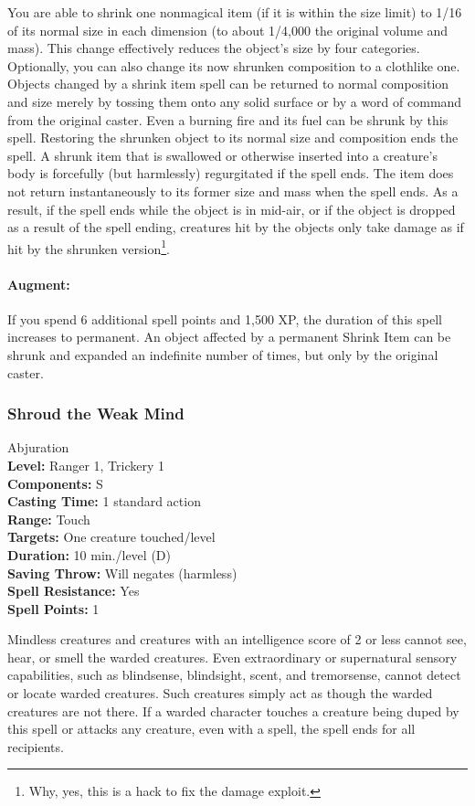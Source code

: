 You are able to shrink one nonmagical item (if it is within the size limit) to 1/16 of its normal size in each dimension (to about 1/4,000 the original volume and mass). This change effectively reduces the object's size by four categories. 
Optionally, you can also change its now shrunken composition to a clothlike one. 
Objects changed by a shrink item spell can be returned to normal composition and size merely by tossing them onto any solid surface or by a word of command from the original caster.
Even a burning fire and its fuel can be shrunk by this spell. 
Restoring the shrunken object to its normal size and composition ends the spell.
A shrunk item that is swallowed or otherwise inserted into a creature's body is forcefully (but harmlessly) regurgitated if the spell ends.
The item does not return instantaneously to its former size and mass when the spell ends. As a result, if the spell ends while the object is in mid-air, or if the object is dropped as a result of the spell ending, creatures hit by the objects only take damage as if hit by the shrunken version\footnote{Why, yes, this is a hack to fix the damage exploit.}.

\paragraph{Augment:} If you spend 6 additional spell points and 1,500 XP, the duration of this spell increases to permanent. An object affected by a permanent Shrink Item can be shrunk and expanded an indefinite number of times, but only by the original caster.
\subsubsection{Shroud the Weak Mind}
\label{Spell:ShroudTheWeakMind}
Abjuration
\\ \textbf{Level:} Ranger 1, Trickery 1
\\ \textbf{Components:} S
\\ \textbf{Casting Time:} 1 standard action
\\ \textbf{Range:} Touch
\\ \textbf{Targets:} One creature touched/level
\\ \textbf{Duration:} 10 min./level (D)
\\ \textbf{Saving Throw:} Will negates (harmless)
\\ \textbf{Spell Resistance:} Yes
\\ \textbf{Spell Points:} 1

Mindless creatures and creatures with an intelligence score of 2 or less cannot see, hear, or smell the warded creatures. 
Even extraordinary or supernatural sensory capabilities, such as blindsense, blindsight, scent, and tremorsense, cannot detect or locate warded creatures. 
Such creatures simply act as though the warded creatures are not there. 
If a warded character touches a creature being duped by this spell or attacks any creature, even with a spell, the spell ends for all recipients.


